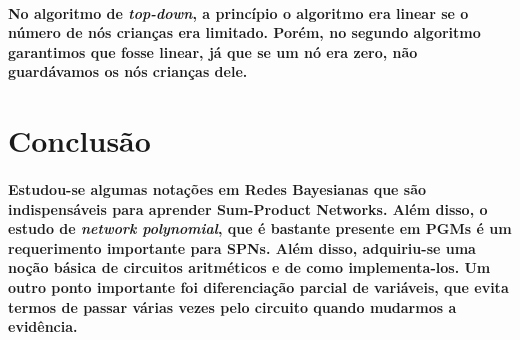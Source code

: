 \documentclass[a4paper,10pt]{article}
\theoremstyle{plain}
\begin{document}
\paragraph{
  No algoritmo de \textit{top-down}, a princípio o algoritmo era linear se o número de nós crianças
era limitado. Porém, no segundo algoritmo garantimos que fosse linear, já que se um nó era zero, 
não guardávamos os nós crianças dele.
}

\section{Conclusão}

\paragraph{
  Estudou-se algumas notações em Redes Bayesianas que são indispensáveis para aprender Sum-Product
Networks. Além disso, o estudo de \textit{network polynomial}, que é bastante presente em PGMs é
um requerimento importante para SPNs. Além disso, adquiriu-se uma noção básica de circuitos
aritméticos e de como implementa-los. Um outro ponto importante foi diferenciação parcial de 
variáveis, que evita termos de passar várias vezes pelo circuito quando mudarmos a evidência.
}

\newpage

\printbibliography
\end{document}
